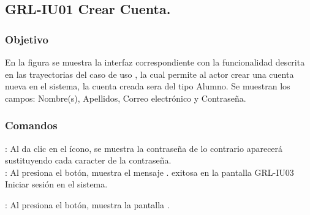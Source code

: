 \clearpage
\subsection{GRL-IU01 Crear Cuenta.}

\subsubsection{Objetivo}
En la figura  se muestra la interfaz correspondiente con la funcionalidad descrita en las
trayectorias del caso de uso  , la cual permite al actor crear una cuenta
nueva en el sistema, la cuenta creada sera del tipo Alumno.
Se muestran los campos: Nombre(s), Apellidos, Correo electrónico y
Contraseña.

\subsubsection{Comandos}

\Titem \IUPass : Al da clic en el ícono, se muestra la contraseña de lo contrario aparecerá \IUOculto \thinspace sustituyendo cada caracter de la contraseña. \\

\Titem {} : Al presiona el botón, muestra el mensaje . exitosa en la
pantalla GRL-IU03 Iniciar sesión en el sistema.

\Titem {} : Al presiona el botón, muestra la pantalla .



\clearpage
